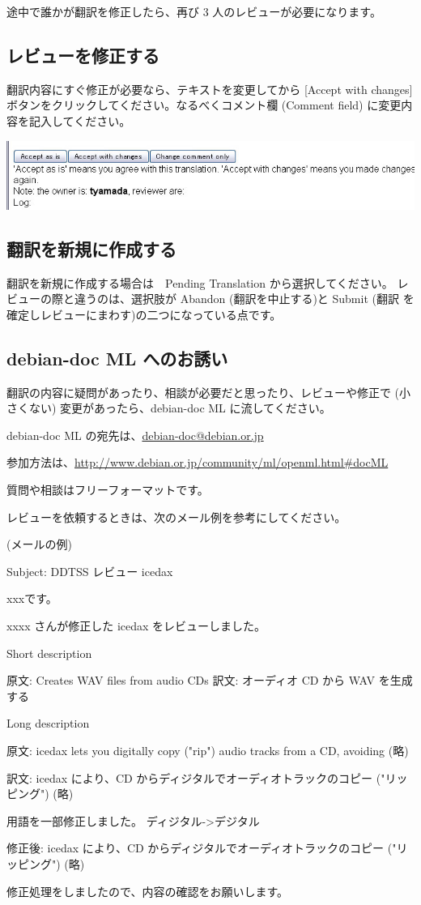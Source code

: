\documentclass[mingoth,a4paper]{jsarticle}
\begin{document}
途中で誰かが翻訳を修正したら、再び 3 人のレビューが必要になります。

\subsection{レビューを修正する}

翻訳内容にすぐ修正が必要なら、テキストを変更してから [Accept with
changes] ボタンをクリックしてください。なるべくコメント欄 (Comment
field) に変更内容を記入してください。

  \includegraphics[scale=0.7]{image200906/ddtss145.jpg}

\subsection{翻訳を新規に作成する}

翻訳を新規に作成する場合は　Pending Translation から選択してください。
レビューの際と違うのは、選択肢が Abandon (翻訳を中止する)と Submit (翻訳
を確定しレビューにまわす)の二つになっている点です。

\subsection{debian-doc ML へのお誘い}

翻訳の内容に疑問があったり、相談が必要だと思ったり、レビューや修正で 
(小さくない) 変更があったら、debian-doc ML に流してください。

debian-doc ML の宛先は、\url{debian-doc@debian.or.jp}

参加方法は、\url{http://www.debian.or.jp/community/ml/openml.html#docML}


質問や相談はフリーフォーマットです。

レビューを依頼するときは、次のメール例を参考にしてください。

(メールの例)

\begin{commandline}
Subject: DDTSS レビュー icedax

xxxです。

xxxx さんが修正した icedax をレビューしました。


Short description

原文: Creates WAV files from audio CDs
訳文: オーディオ CD から WAV を生成する

Long description

原文:
icedax lets you digitally copy ("rip") audio tracks from a CD, avoiding
(略)

訳文:
icedax により、CD からディジタルでオーディオトラックのコピー ("リッピング")
(略)

用語を一部修正しました。
ディジタル->デジタル

修正後:
icedax により、CD からディジタルでオーディオトラックのコピー ("リッピング")
(略)

修正処理をしましたので、内容の確認をお願いします。
\end{commandline}
\end{document}
